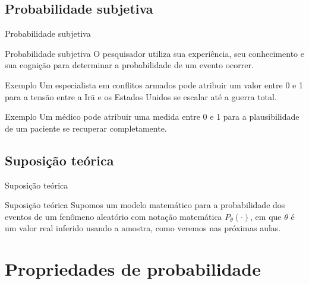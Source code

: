 \documentclass[9pt]{beamer}
\begin{document}
\subsection{Probabilidade subjetiva}
\begin{frame}{Probabilidade subjetiva}
	\begin{block}{Probabilidade subjetiva}
		O pesquisador utiliza sua experiência, seu conhecimento e sua cognição para determinar a probabilidade de um evento ocorrer.
	\end{block}
	\begin{block}{Exemplo}
		Um especialista em conflitos armados pode atribuir um valor entre 0 e 1 para a tensão entre a Irã e os Estados Unidos se escalar até a guerra total.
	\end{block}
	\begin{block}{Exemplo}
		Um médico pode atribuir uma medida entre 0 e 1 para a plausibilidade de um paciente se recuperar completamente.
	\end{block}
\end{frame}

\subsection{Suposição teórica}
\begin{frame}{Suposição teórica}

	\huge{
	\begin{block}{Suposição teórica}
		Supomos um modelo matemático para a probabilidade dos eventos de um fenômeno aleatório com notação matemática $P_\theta(\cdot)$, em que $\theta$ é um valor real inferido usando a amostra, como veremos nas próximas aulas.
	\end{block}
	}
\end{frame}

\section{Propriedades de probabilidade}
\end{document}
